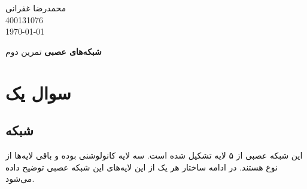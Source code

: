 \documentclass[12pt, a4paper]{article}
\newcommand{\coursetitle}{شبکه‌های عصبی}
\newcommand{\doctitle}{تمرین دوم}
\newcommand{\name}{محمدرضا غفرانی}
\newcommand{\studentno}{400131076}
\newcommand{\todaydate}{\today}
\begin{document}
\begin{flushleft}
    \name \\
    \studentno \\
    \todaydate
\end{flushleft}

\begin{center}
    \huge
    \textbf{\coursetitle}
    \break
    \large
    \doctitle
\end{center}

\thispagestyle{plain}

\section*{سوال یک}

\subsection*{شبکه }

این شبکه عصبی از ۵ لایه تشکیل شده است. سه لایه‌ کانولوشنی بوده و باقی لایه‌ها
از نوع  هستند. در ادامه ساختار هر یک از این لایه‌های این شبکه عصبی توضیح داده می‌شود.
\end{document}
